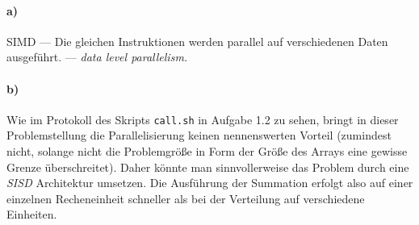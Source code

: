 \documentclass[a4paper,
               12pt,
               BCOR12mm,
               ]{scrartcl}
\begin{document}
	\paragraph{a)} SIMD --- Die gleichen Instruktionen werden parallel auf verschiedenen
				Daten ausgeführt. --- \emph{data level parallelism.}
	\paragraph{b)} 
	Wie im Protokoll des Skripts \verb|call.sh| in Aufgabe 1.2 zu sehen, bringt in dieser
	Problemstellung die Parallelisierung keinen nennenswerten Vorteil (zumindest nicht,
	solange nicht die Problemgröße in Form der Größe des Arrays eine gewisse Grenze
	überschreitet). Daher könnte man sinnvollerweise das Problem durch eine \emph{SISD}
	Architektur umsetzen. Die Ausführung der Summation erfolgt also auf einer einzelnen
	Recheneinheit schneller als bei der Verteilung auf verschiedene Einheiten.
	

		\nocite{*}
		
		
\end{document}
